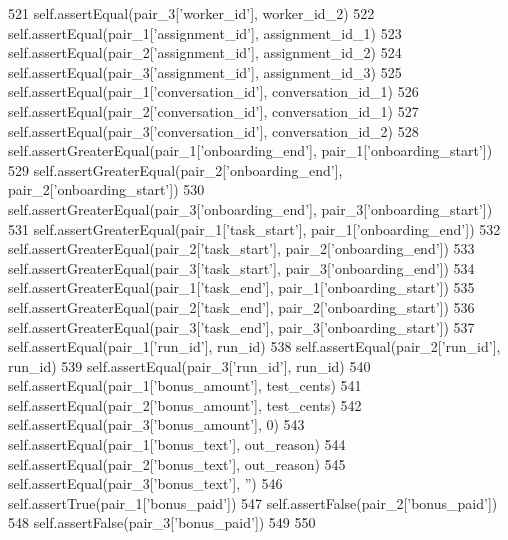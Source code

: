 \begin{DoxyCode}
521         self.assertEqual(pair\_3[\textcolor{stringliteral}{'worker\_id'}], worker\_id\_2)
522         self.assertEqual(pair\_1[\textcolor{stringliteral}{'assignment\_id'}], assignment\_id\_1)
523         self.assertEqual(pair\_2[\textcolor{stringliteral}{'assignment\_id'}], assignment\_id\_2)
524         self.assertEqual(pair\_3[\textcolor{stringliteral}{'assignment\_id'}], assignment\_id\_3)
525         self.assertEqual(pair\_1[\textcolor{stringliteral}{'conversation\_id'}], conversation\_id\_1)
526         self.assertEqual(pair\_2[\textcolor{stringliteral}{'conversation\_id'}], conversation\_id\_1)
527         self.assertEqual(pair\_3[\textcolor{stringliteral}{'conversation\_id'}], conversation\_id\_2)
528         self.assertGreaterEqual(pair\_1[\textcolor{stringliteral}{'onboarding\_end'}], pair\_1[\textcolor{stringliteral}{'onboarding\_start'}])
529         self.assertGreaterEqual(pair\_2[\textcolor{stringliteral}{'onboarding\_end'}], pair\_2[\textcolor{stringliteral}{'onboarding\_start'}])
530         self.assertGreaterEqual(pair\_3[\textcolor{stringliteral}{'onboarding\_end'}], pair\_3[\textcolor{stringliteral}{'onboarding\_start'}])
531         self.assertGreaterEqual(pair\_1[\textcolor{stringliteral}{'task\_start'}], pair\_1[\textcolor{stringliteral}{'onboarding\_end'}])
532         self.assertGreaterEqual(pair\_2[\textcolor{stringliteral}{'task\_start'}], pair\_2[\textcolor{stringliteral}{'onboarding\_end'}])
533         self.assertGreaterEqual(pair\_3[\textcolor{stringliteral}{'task\_start'}], pair\_3[\textcolor{stringliteral}{'onboarding\_end'}])
534         self.assertGreaterEqual(pair\_1[\textcolor{stringliteral}{'task\_end'}], pair\_1[\textcolor{stringliteral}{'onboarding\_start'}])
535         self.assertGreaterEqual(pair\_2[\textcolor{stringliteral}{'task\_end'}], pair\_2[\textcolor{stringliteral}{'onboarding\_start'}])
536         self.assertGreaterEqual(pair\_3[\textcolor{stringliteral}{'task\_end'}], pair\_3[\textcolor{stringliteral}{'onboarding\_start'}])
537         self.assertEqual(pair\_1[\textcolor{stringliteral}{'run\_id'}], run\_id)
538         self.assertEqual(pair\_2[\textcolor{stringliteral}{'run\_id'}], run\_id)
539         self.assertEqual(pair\_3[\textcolor{stringliteral}{'run\_id'}], run\_id)
540         self.assertEqual(pair\_1[\textcolor{stringliteral}{'bonus\_amount'}], test\_cents)
541         self.assertEqual(pair\_2[\textcolor{stringliteral}{'bonus\_amount'}], test\_cents)
542         self.assertEqual(pair\_3[\textcolor{stringliteral}{'bonus\_amount'}], 0)
543         self.assertEqual(pair\_1[\textcolor{stringliteral}{'bonus\_text'}], out\_reason)
544         self.assertEqual(pair\_2[\textcolor{stringliteral}{'bonus\_text'}], out\_reason)
545         self.assertEqual(pair\_3[\textcolor{stringliteral}{'bonus\_text'}], \textcolor{stringliteral}{''})
546         self.assertTrue(pair\_1[\textcolor{stringliteral}{'bonus\_paid'}])
547         self.assertFalse(pair\_2[\textcolor{stringliteral}{'bonus\_paid'}])
548         self.assertFalse(pair\_3[\textcolor{stringliteral}{'bonus\_paid'}])
549 
550 
\end{DoxyCode}


